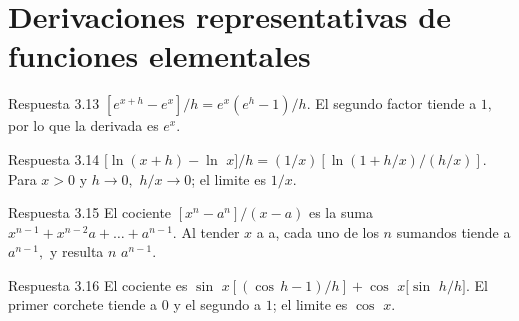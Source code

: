 \documentclass[10pt,a4paper,oneside,openany]{book}
\begin{document}
\section{Derivaciones representativas de funciones elementales}
\begin{PSevenAnswerFixed}{Respuesta 3.13}
\([e^{x+h}-e^x]/h=e^x(e^h-1)/h\). El segundo factor tiende a \(1,\) por lo que la derivada es \(e^x\).
\end{PSevenAnswerFixed}
\begin{PSevenAnswerFixed}{Respuesta 3.14}
\([\ln(x+h)-\ln\) \(x]/h=(1/x)[\ln(1+h/x)/(h/x)]\). Para \(x>0\) y \(h\to 0,\) \(h/x\to 0\); el limite es \(1/x\).
\end{PSevenAnswerFixed}
\begin{PSevenAnswerFixed}{Respuesta 3.15}
El cociente \([x^n-a^n]/(x-a)\) es la suma \(x^{n-1}+x^{n-2}a+\ldots +a^{n-1}\). Al tender \(x\) a a, cada uno de los \(n\) sumandos tiende a \(a^{n-1},\) y resulta \(n\) \(a^{n-1}\).
\end{PSevenAnswerFixed}
\begin{PSevenAnswerFixed}{Respuesta 3.16}
El cociente es \(\sin\) \(x[(\cos\,h-1)/h]+\cos\) \(x[\sin\) \(h/h]\). El primer corchete tiende a \(0\) y el segundo a \(1\); el limite es \(\cos\) \(x\).
\end{PSevenAnswerFixed}
\end{document}
